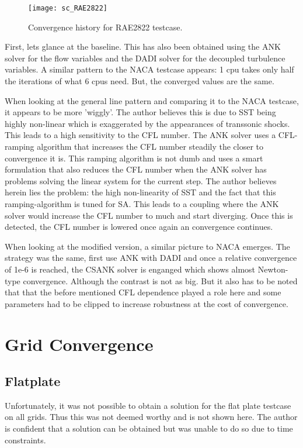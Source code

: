 \begin{figure}[H] \centering
    \texttt{[image: sc\_RAE2822]}
    \caption{Convergence history for RAE2822 testcase.}
    \label{fig:sc_RAE2822}
\end{figure}

\noindent First, lets glance at the baseline. This has also been obtained
using the ANK solver for the flow variables and the DADI solver for the
decoupled turbulence variables. A similar pattern to the NACA
testcase appears: 1 cpu takes only half the iterations of what 6 cpus need.
But, the converged values are the same. 

When looking at the general line pattern and comparing it to the NACA testcase,
it appears to be more 'wiggly'. The author believes this is due to SST being
highly non-linear which is exaggerated by the appearances of transsonic shocks.
This leads to a high sensitivity to the CFL number. The ANK solver uses a
CFL-ramping algorithm that increases the CFL number steadily the closer to
convergence it is. This ramping algorithm is not dumb and uses a smart
formulation that also reduces the CFL number when the ANK solver has problems
solving the linear system for the current step. The author believes herein lies
the problem: the high non-linearity of SST and the fact that this
ramping-algorithm is tuned for SA. This leads to a coupling where the ANK
solver would increase the CFL number to much and start diverging. Once this is
detected, the CFL number is lowered once again an convergence continues. 

When looking at the modified version, a similar picture to NACA emerges. The
strategy was the same, first use ANK with DADI and once a relative convergence
of 1e-6 is reached, the CSANK solver is enganged which shows almost Newton-type
convergence. Although the contrast is not as big. But it also has to be noted
that that the before mentioned CFL dependence played a role here and some
parameters had to be clipped to increase robustness at the cost of convergence.








\section{Grid Convergence}
\subsection{Flatplate}
Unfortunately, it was not possible to obtain a solution for the flat plate
testcase on all grids. Thus this was not deemed worthy and is not shown here.
The author is confident that a solution can be obtained but was unable to do so
due to time constraints.

